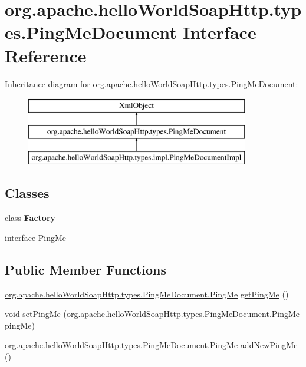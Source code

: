 \hypertarget{interfaceorg_1_1apache_1_1hello_world_soap_http_1_1types_1_1_ping_me_document}{}\section{org.\+apache.\+hello\+World\+Soap\+Http.\+types.\+Ping\+Me\+Document Interface Reference}
\label{interfaceorg_1_1apache_1_1hello_world_soap_http_1_1types_1_1_ping_me_document}
Inheritance diagram for org.\+apache.\+hello\+World\+Soap\+Http.\+types.\+Ping\+Me\+Document\+:\begin{figure}[H]
\begin{center}
\leavevmode
\includegraphics[height=3.000000cm]{interfaceorg_1_1apache_1_1hello_world_soap_http_1_1types_1_1_ping_me_document}
\end{center}
\end{figure}
\subsection*{Classes}
\begin{DoxyCompactItemize}
\item 
class {\bfseries Factory}
\item 
interface \hyperlink{interfaceorg_1_1apache_1_1hello_world_soap_http_1_1types_1_1_ping_me_document_1_1_ping_me}{Ping\+Me}
\end{DoxyCompactItemize}
\subsection*{Public Member Functions}
\begin{DoxyCompactItemize}
\item 
\hyperlink{interfaceorg_1_1apache_1_1hello_world_soap_http_1_1types_1_1_ping_me_document_1_1_ping_me}{org.\+apache.\+hello\+World\+Soap\+Http.\+types.\+Ping\+Me\+Document.\+Ping\+Me} \hyperlink{interfaceorg_1_1apache_1_1hello_world_soap_http_1_1types_1_1_ping_me_document_a30b38f0551d42dba4dc173dd5206fc98}{get\+Ping\+Me} ()
\item 
void \hyperlink{interfaceorg_1_1apache_1_1hello_world_soap_http_1_1types_1_1_ping_me_document_af56da1c735a44c05555c57b264d25e38}{set\+Ping\+Me} (\hyperlink{interfaceorg_1_1apache_1_1hello_world_soap_http_1_1types_1_1_ping_me_document_1_1_ping_me}{org.\+apache.\+hello\+World\+Soap\+Http.\+types.\+Ping\+Me\+Document.\+Ping\+Me} ping\+Me)
\item 
\hyperlink{interfaceorg_1_1apache_1_1hello_world_soap_http_1_1types_1_1_ping_me_document_1_1_ping_me}{org.\+apache.\+hello\+World\+Soap\+Http.\+types.\+Ping\+Me\+Document.\+Ping\+Me} \hyperlink{interfaceorg_1_1apache_1_1hello_world_soap_http_1_1types_1_1_ping_me_document_afe9371a29d9ce3e3e07bf8b6d1b5cdf5}{add\+New\+Ping\+Me} ()
\end{DoxyCompactItemize}
